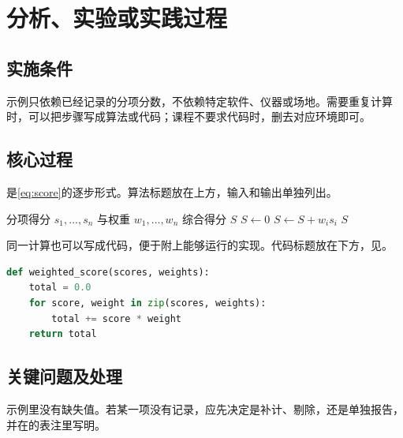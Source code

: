 \section{分析、实验或实践过程}
\label{sec:process}

\subsection{实施条件}
示例只依赖已经记录的分项分数，不依赖特定软件、仪器或场地。需要重复计算时，可以把步骤写成算法或代码；课程不要求代码时，删去对应环境即可。

\subsection{核心过程}
是\eqref{eq:score}的逐步形式。算法标题放在上方，输入和输出单独列出。

\begin{algorithm}[htbp]
  \caption{由分项得分计算综合得分}
  \label{alg:score}
  \begin{algorithmic}[1]
    \Require 分项得分 $s_1,\ldots,s_n$ 与权重 $w_1,\ldots,w_n$
    \Ensure 综合得分 $S$
    \State $S \gets 0$
      \State $S \gets S + w_i s_i$
    \EndFor
    \State \Return $S$
  \end{algorithmic}
\end{algorithm}

同一计算也可以写成代码，便于附上能够运行的实现。代码标题放在下方，见。

\begin{lstlisting}[language=Python,caption={按权重汇总分项得分},label={lst:score}]
def weighted_score(scores, weights):
    total = 0.0
    for score, weight in zip(scores, weights):
        total += score * weight
    return total
\end{lstlisting}

\subsection{关键问题及处理}
示例里没有缺失值。若某一项没有记录，应先决定是补计、剔除，还是单独报告，并在的表注里写明。
